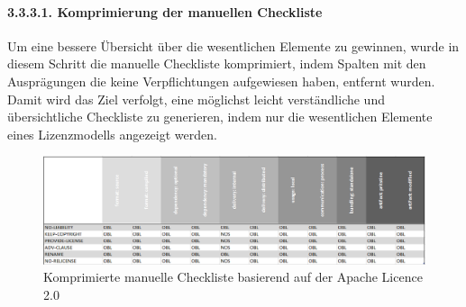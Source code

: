 \newpage
\paragraph{3.3.3.1. Komprimierung der manuellen Checkliste}

Um eine bessere Übersicht über die wesentlichen Elemente zu gewinnen, wurde in diesem Schritt die manuelle Checkliste komprimiert, indem Spalten mit den Ausprägungen die keine Verpflichtungen aufgewiesen haben, entfernt wurden. Damit wird das Ziel verfolgt, eine möglichst leicht verständliche und übersichtliche Checkliste zu generieren, indem nur die wesentlichen Elemente eines Lizenzmodells angezeigt werden. 

\begin{figure}[h]
    \centering
    \includegraphics[scale=0.6]{Bilder/Manuelle Checkliste_komprimiert.png}
    \caption{Komprimierte manuelle Checkliste basierend auf der Apache Licence 2.0}
\end{figure}





